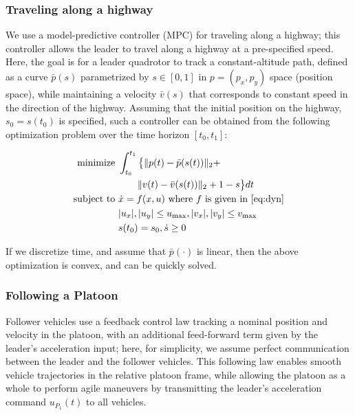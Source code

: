 \subsubsection{Traveling along a highway} \label{sec:travel_hwy}
We use a model-predictive controller (MPC) for traveling along a highway; this controller allows the leader to travel along a highway at a pre-specified speed. Here, the goal is for a leader quadrotor to track a constant-altitude path, defined as a curve $\bar{p}(s)$ parametrized by $s\in[0,1]$ in $p=(p_x, p_y)$ space (position space), while maintaining a velocity $\bar{v}(s)$ that corresponds to constant speed in the direction of the highway. Assuming that the initial position on the highway, $s_0=s(t_0)$ is specified, such a controller can be obtained from the following optimization problem over the time horizon $[t_0, t_1]$:

\begin{equation}
\begin{aligned}
\text{minimize } & \int_{t_0}^{t_1} \big\{\| p(t)-\bar{p}(s(t)) \|_2 + \\ 
&\qquad \| v(t) - \bar{v}(s(t)) \|_2 + 1-s \big\} dt \\
\text{subject to } & \dot{x} = f(x,u) \text{ where } f \text{ is given in \eqref{eq:dyn}} \\
& |u_x|, |u_y| \le u_\text{max}, |v_x|, |v_y| \le v_\text{max} \\
& s(t_0) = s_0, \dot{s} \ge 0
\end{aligned}
\end{equation}

If we discretize time, and assume that $\bar{p}(\cdot)$ is linear, then the above optimization is convex, and can be quickly solved.

\subsubsection{Following a Platoon} \label{sec:follow_platoon}
Follower vehicles use a feedback control law tracking a nominal position and velocity in the platoon, with an additional feed-forward term given by the leader's acceleration input; here, for simplicity, we assume perfect communication between the leader and the follower vehicles. This following law enables smooth vehicle trajectories in the relative platoon frame, while allowing the platoon as a whole to perform agile maneuvers by transmitting the leader's acceleration command $u_{P_1}(t)$ to all vehicles.


